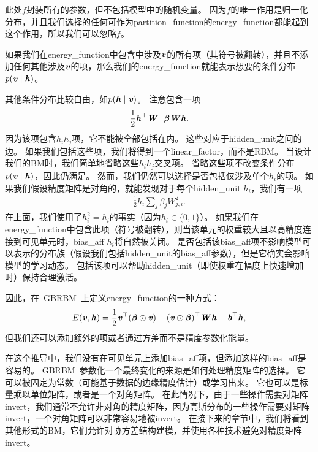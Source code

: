 
此处$f$封装所有的参数，但不包括模型中的随机变量。
因为$f$的唯一作用是归一化分布，并且我们选择的任何可作为\gls{partition_function}的\gls{energy_function}都能起到这个作用，所以我们可以忽略$f$。

如果我们在\gls{energy_function}中包含中涉及$\boldsymbol{\mathit{v}}$的所有项（其符号被翻转），并且不添加任何其他涉及$\boldsymbol{\mathit{v}}$的项，那么我们的\gls{energy_function}就能表示想要的条件分布$p(\boldsymbol{\mathit{v}}  \mid  \boldsymbol{\mathit{h}})$。

其他条件分布比较自由，如$p(\boldsymbol{\mathit{h}}  \mid  \boldsymbol{\mathit{v}})$。
注意包含一项
\begin{align}
 \frac{1}{2}\boldsymbol{\mathit{h}}^\top\boldsymbol{\mathit{W}}^\top \boldsymbol{\beta} \boldsymbol{\mathit{W}} \boldsymbol{\mathit{h}} .
\end{align}
因为该项包含$h_i h_j$项，它不能被全部包括在内。
这些对应于\gls{hidden_unit}之间的边。
如果我们包括这些项，我们将得到一个\gls{linear_factor}，而不是\gls{RBM}。
当设计我们的\gls{BM}时，我们简单地省略这些$h_i h_j$交叉项。
省略这些项不改变条件分布$p(\boldsymbol{\mathit{v}}  \mid  \boldsymbol{\mathit{h}})$，因此仍满足。
然而，我们仍然可以选择是否包括仅涉及单个$h_i$的项。
如果我们假设精度矩阵是对角的，就能发现对于每个\gls{hidden_unit} $h_i$，我们有一项
\begin{align}
 \frac{1}{2} h_i \sum_j \beta_j W_{j,i}^2.
\end{align}
在上面，我们使用了$h_i^2 = h_i$的事实（因为$h_i \in \{ 0, 1\}$）。
如果我们在\gls{energy_function}中包含此项（符号被翻转），则当该单元的权重较大且以高精度连接到可见单元时，\gls{bias_aff} $h_i$将自然被关闭。
是否包括该\gls{bias_aff}项不影响模型可以表示的分布族（假设我们包括\gls{hidden_unit}的\gls{bias_aff}参数），但是它确实会影响模型的学习动态。
包括该项可以帮助\gls{hidden_unit}（即使权重在幅度上快速增加时）保持合理激活。

因此，在~\gls{GBRBM}~上定义\gls{energy_function}的一种方式：
\begin{align}
 E(\boldsymbol{\mathit{v}}, \boldsymbol{\mathit{h}}) = \frac{1}{2} \boldsymbol{\mathit{v}}^\top (\boldsymbol{\beta} \odot \boldsymbol{\mathit{v}}) -  (\boldsymbol{\mathit{v}} \odot \boldsymbol{\beta})^\top\boldsymbol{\mathit{W}} \boldsymbol{\mathit{h}} - \boldsymbol{\mathit{b}}^\top \boldsymbol{\mathit{h}},
\end{align}
但我们还可以添加额外的项或者通过方差而不是精度参数化能量。


在这个推导中，我们没有在可见单元上添加\gls{bias_aff}项，但添加这样的\gls{bias_aff}是容易的。
\gls{GBRBM}~参数化一个最终变化的来源是如何处理精度矩阵的选择。
它可以被固定为常数（可能基于数据的边缘精度估计）或学习出来。
它也可以是标量乘以单位矩阵，或者是一个对角矩阵。
在此情况下，由于一些操作需要对矩阵\gls{invert}，我们通常不允许非对角的精度矩阵，因为高斯分布的一些操作需要对矩阵\gls{invert}，一个对角矩阵可以非常容易地被\gls{invert}。
在接下来的章节中，我们将看到其他形式的\gls{BM}，它们允许对协方差结构建模，并使用各种技术避免对精度矩阵\gls{invert}。


